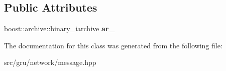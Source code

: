 \subsection*{\-Public \-Attributes}
\begin{DoxyCompactItemize}
\item 
\hypertarget{classgal_1_1network_1_1imessage_a024ced0e503c39e7ff210c6eff53c2fd}{boost\-::archive\-::binary\-\_\-iarchive {\bfseries ar\-\_\-}}\label{classgal_1_1network_1_1imessage_a024ced0e503c39e7ff210c6eff53c2fd}

\end{DoxyCompactItemize}


\-The documentation for this class was generated from the following file\-:\begin{DoxyCompactItemize}
\item 
src/gru/network/message.\-hpp\end{DoxyCompactItemize}

